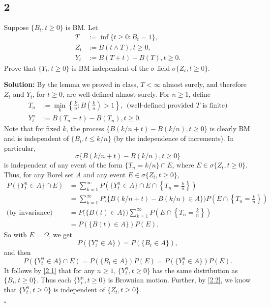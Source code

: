 \documentclass[12pt]{article}
\newcounter{ProofCounter}
\newenvironment{Solution}{\stepcounter{ProofCounter}\textbf{Solution:}}{\hfill$\square$}
\begin{document}
\subsection*{2}
\begin{tcolorbox}
  Suppose $\{B_t, t \geq 0\}$ is BM. Let 
  \begin{align*}
    T & := \inf\{t \geq 0 : B_t = 1\}, \\
    Z_t & := B(t \wedge T), t \geq 0, \\
    Y_t & := B(T + t) - B(T), t \geq 0.
  \end{align*}
  Prove that $\{ Y_t, t \geq 0\}$ is BM independent of the $\sigma$-field $\sigma\{ Z_t, t \geq 0\}$.
\end{tcolorbox}
\begin{Solution}
  By the lemma we proved in class, $T < \infty$ almost surely, and therefore $Z_t$ and $Y_t$, for $t \geq 0$, are well-defined almost surely. For $n \geq 1$, define
  \begin{align*}
    T_n & := \min_{k} \left\{ \frac{k}{n} : B\left( \frac{k}{n} \right) > 1 \right\}, \ \ \text{(well-defined provided $T$ is finite)} \\
    Y_{t}^n & := B(T_n + t) - B(T_n), t \geq 0.
  \end{align*}
  Note that for fixed $k$, the process $\{B(k/n + t) - B(k/n), t \geq 0 \}$ is clearly BM and is independent of $\{ B_t, t  \leq k/n \}$ (by the independence of increments). In particular,
  \[
    \sigma\{B(k/n + t) - B(k/n), t \geq 0\}
  \]
  is independent of any event of the form $\{ T_n = k/n \} \cap E$, where $E \in \sigma\{Z_t, t \geq 0\}$.
  Thus, for any Borel set $A$ and any event $E \in \sigma\{Z_t, t \geq 0\}$,
  \begin{align*}
    P(\{Y_t^n \in A\} \cap E) & = \sum_{k=1}^{\infty} P\left(\{Y_t^n \in A\} \cap E \cap \left\{T_n = \frac{k}{n}\right\}\right) \\
    & = \sum_{k=1}^{\infty} P\bigg( \{B(k/n + t) - B(k/n) \in A\}\bigg)P\left(E \cap \left\{T_n = \frac{k}{n}\right\} \right) \\
    \text{(by invariance)} \ \ \ & = P\bigg( \{B(t) \in A\}\bigg)\sum_{k=1}^{\infty} P\left(E \cap \left\{T_n = \frac{k}{n}\right\} \right) \\
    & = P( \{B(t) \in A\})P(E).
  \end{align*}
  So with $E = \Omega$, we get
  \begin{equation}
    P(\{Y_t^n \in A\}) = P(\{B_t \in A\}),
    \label{2.1}
  \end{equation}
  and then
  \begin{equation}
    P(\{Y_t^n \in A\} \cap E) = P(\{B_t \in A\})P(E) = P(\{Y_t^n \in A\})P(E).
    \label{2.2}
  \end{equation}
  It follows by \eqref{2.1} that for any $n \geq 1$, $\{ Y_t^n, t \geq 0\}$ has the same distribution as $\{ B_t, t \geq 0\}$. Thus each $\{ Y_t^n, t \geq 0\}$ is Brownian motion.
  Further, by \eqref{2.2}, we know that $\{ Y_t^n, t \geq 0\}$ is independent of $\{ Z_t, t \geq 0\}$.


\end{Solution}
\end{document}
